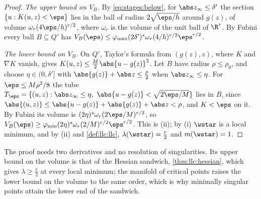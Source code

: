 \begin{refsection}
\begin{proof}
\emph{The upper bound on $V_B$.} By \eqref{eq:stages:below}, for $\abs z_\infty\le\delta'$ the section $\{u:K(u,z)<\eps\}$ lies in the ball of radius $2\sqrt{\eps/h}$ around $g(z)$, of volume $\omega_r(4\eps/h)^{r/2}$, where $\omega_r$ is the volume of the unit ball of $\R^r$. By Fubini every ball $B\subseteq Q'$ has $V_B(\eps)\le\varphi_{\max}(2\delta')^s\omega_r(4/h)^{r/2}\eps^{r/2}$.

\emph{The lower bound on $V_B$.} On $Q'$, Taylor's formula from $(g(z),z)$, where $K$ and $\nabla K$ vanish, gives $K(u,z)\le\frac M2\abs{u-g(z)}^2$. Let $B$ have radius $\rho\le\rho_0$, and choose $\eta\in(0,\delta']$ with $\abs{g(z)}+\abs z\le\frac\rho2$ when $\abs z_\infty\le\eta$. For $\eps\le M\rho^2/8$ the tube $T_\eps=\{(u,z):\abs z_\infty\le\eta,\ \abs{u-g(z)}<\sqrt{2\eps/M}\}$ lies in $B$, since $\abs{(u,z)}\le\abs{u-g(z)}+\abs{g(z)}+\abs z<\rho$, and $K<\eps$ on it. By Fubini its volume is $(2\eta)^s\omega_r(2\eps/M)^{r/2}$, so $V_B(\eps)\ge\varphi_{\min}(2\eta)^s\omega_r(2/M)^{r/2}\eps^{r/2}$. This is (ii); by (i) $\wstar$ is a local minimum, and by (ii) and \cref{def:llc:llc}, $\lambda(\wstar)=\frac r2$ and $m(\wstar)=1$.
\end{proof}

The proof needs two derivatives and no resolution of singularities. Its upper bound on the volume is that of the Hessian sandwich, \cref{thm:llc:hessian}, which gives $\lambda\ge\frac r2$ at every local minimum; the manifold of critical points raises the lower bound on the volume to the same order, which is why minimally singular points attain the lower end of the sandwich.


\end{refsection}
